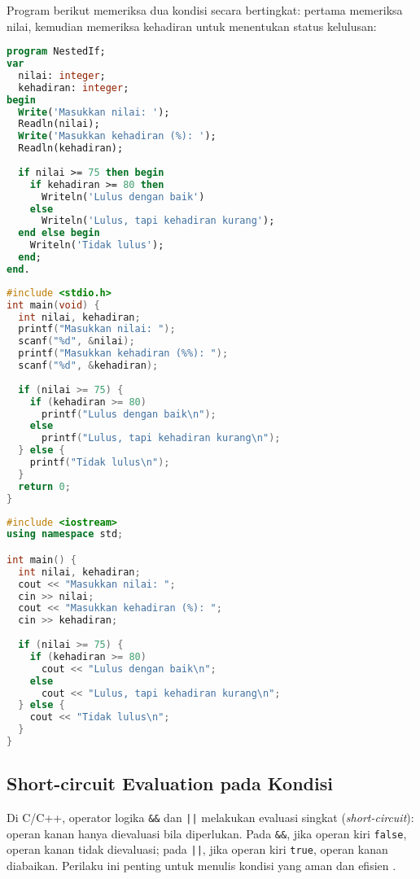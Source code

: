 \documentclass[../main.tex]{subfiles}
\begin{document}
Program berikut memeriksa dua kondisi secara bertingkat: pertama memeriksa nilai, kemudian memeriksa kehadiran untuk menentukan status kelulusan:

\begin{lstlisting}[language=Pascal, caption={Nested if di Pascal}]
program NestedIf;
var
  nilai: integer;
  kehadiran: integer;
begin
  Write('Masukkan nilai: ');
  Readln(nilai);
  Write('Masukkan kehadiran (%): ');
  Readln(kehadiran);
  
  if nilai >= 75 then begin
    if kehadiran >= 80 then
      Writeln('Lulus dengan baik')
    else
      Writeln('Lulus, tapi kehadiran kurang');
  end else begin
    Writeln('Tidak lulus');
  end;
end.
\end{lstlisting}

\begin{lstlisting}[language=C, caption={Nested if di C}]
#include <stdio.h>
int main(void) {
  int nilai, kehadiran;
  printf("Masukkan nilai: ");
  scanf("%d", &nilai);
  printf("Masukkan kehadiran (%%): ");
  scanf("%d", &kehadiran);
  
  if (nilai >= 75) {
    if (kehadiran >= 80)
      printf("Lulus dengan baik\n");
    else
      printf("Lulus, tapi kehadiran kurang\n");
  } else {
    printf("Tidak lulus\n");
  }
  return 0;
}
\end{lstlisting}

\begin{lstlisting}[language=C++, caption={Nested if di C++}]
#include <iostream>
using namespace std;

int main() {
  int nilai, kehadiran;
  cout << "Masukkan nilai: ";
  cin >> nilai;
  cout << "Masukkan kehadiran (%): ";
  cin >> kehadiran;
  
  if (nilai >= 75) {
    if (kehadiran >= 80)
      cout << "Lulus dengan baik\n";
    else
      cout << "Lulus, tapi kehadiran kurang\n";
  } else {
    cout << "Tidak lulus\n";
  }
}
\end{lstlisting}

\subsection{Short-circuit Evaluation pada Kondisi}
Di C/C++, operator logika \texttt{\&\&} dan \texttt{||} melakukan evaluasi singkat (\emph{short-circuit}): operan kanan hanya dievaluasi bila diperlukan. Pada \texttt{\&\&}, jika operan kiri \texttt{false}, operan kanan tidak dievaluasi; pada \texttt{||}, jika operan kiri \texttt{true}, operan kanan diabaikan. Perilaku ini penting untuk menulis kondisi yang aman dan efisien \parencite{gnu-c-manual,cpp-reference}.
\end{document}
